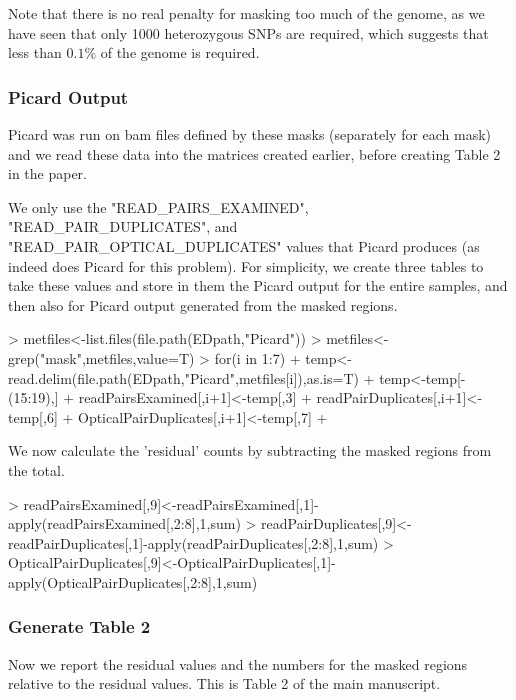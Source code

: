 \documentclass{article}
\begin{document}
Note that there is no real penalty for masking too much of the genome, as we have seen that only 1000 heterozygous SNPs are required, which suggests that less than $0.1\%$ of the genome is required.

\subsubsection{Picard Output}

Picard was run on bam files defined by these masks (separately for each mask) and we read these data into the matrices created earlier, before creating Table 2 in the paper.

We only use the "READ\_PAIRS\_EXAMINED", "READ\_PAIR\_DUPLICATES", and "READ\_PAIR\_OPTICAL\_DUPLICATES" values that Picard produces (as indeed does Picard for this problem). For simplicity, we create three tables to take these values and store in them the Picard output for the entire samples, and then also for Picard output generated from the masked regions.

\begin{Schunk}
\begin{Sinput}
> metfiles<-list.files(file.path(EDpath,"Picard"))
> metfiles<-grep("mask",metfiles,value=T)
> for(i in 1:7){
+   temp<-read.delim(file.path(EDpath,"Picard",metfiles[i]),as.is=T)
+   temp<-temp[-(15:19),]
+   readPairsExamined[,i+1]<-temp[,3]
+   readPairDuplicates[,i+1]<-temp[,6]
+   OpticalPairDuplicates[,i+1]<-temp[,7]
+ }
\end{Sinput}
\end{Schunk}

We now calculate the 'residual' counts by subtracting the masked regions from the total.

\begin{Schunk}
\begin{Sinput}
> readPairsExamined[,9]<-readPairsExamined[,1]-apply(readPairsExamined[,2:8],1,sum)
> readPairDuplicates[,9]<-readPairDuplicates[,1]-apply(readPairDuplicates[,2:8],1,sum)
> OpticalPairDuplicates[,9]<-OpticalPairDuplicates[,1]-apply(OpticalPairDuplicates[,2:8],1,sum)
\end{Sinput}
\end{Schunk}


\subsubsection{Generate Table 2}

Now we report the residual values and the numbers for the masked regions relative to the residual values. This is Table 2 of the main manuscript. 
\end{document}
